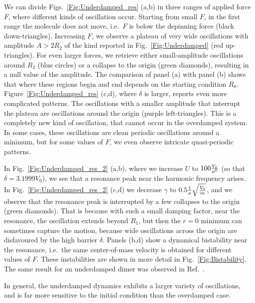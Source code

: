 We can divide Figs.~\ref{Fig:Underdamped_res} (a,b) in three ranges of applied force $F$, where different kinds of oscillation occur. Starting from small $F$, in the first range the molecule does not move, i.e.\ $F$ is below the depinning force (black down-triangles). Increasing $F$, we observe a plateau of very wide oscillations with amplitude $A > 2 R_{2}$ of the kind reported in Fig.~\ref{Fig:Underdamped} (red up-triangles). For even larger forces, we retrieve either small-amplitude oscillations around $R_2$ (blue circles) or a collapse to the origin (green diamonds), resulting in a null value of the amplitude. The comparison of panel (a) with panel (b) shows that where these regions begin and end depends on the starting condition $R_0$. Figure~\ref{Fig:Underdamped_res} (c,d), where $\delta$ is larger, reports even more complicated patterns. The oscillations with a smaller amplitude that interrupt the plateau are oscillations around the origin (purple left-triangles). This is a completely new kind of oscillation, that cannot occur in the overdamped system. In some cases, these oscillations are clean periodic oscillations around a minimum, but for some values of $F$, we even observe intricate quasi-periodic patterns.

In Fig.~\ref{Fig:Underdamped_res_2} (a,b), where we increase $U$ to  $100\frac{V_0}{a^6}$ (so that $\delta=3.1999  V_0$), we see that a resonance peak near the harmonic frequency arises.  In Fig.~\ref{Fig:Underdamped_res_2} (c,d) we decrease $\gamma$ to $0.5\frac{1}{a}\sqrt{\frac{V_0}{m}}$, and we observe that the resonance peak is interrupted by a few collapses to the origin (green diamonds). That is because with such a small damping factor, near the resonance, the oscillation extends beyond $R_1$, but then the $r=0$ minimum can sometimes capture the motion, because wide oscillations across the origin are disfavoured by the high barrier $\delta$. Panels (b,d) show a dynamical bistability near the resonance, i.e.\ the same center-of-mass velocity is obtained for different values of $F$. These instabilities are shown in more detail in Fig.~\ref{Fig:Bistability}. The same result for an underdamped dimer was observed in Ref.~\cite{Fusco}. 

In general, the underdamped dynamics exhibits a larger variety of oscillations, and is far more sensitive to the initial condition than the overdamped case. 